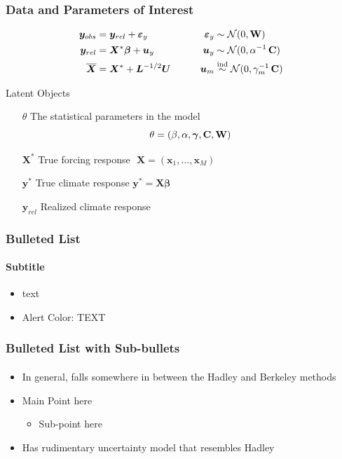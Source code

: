 \documentclass{beamer}
\newcommand{\C}{\ensuremath{\text{Cov}}}
\def\*#1{\bm{#1}}
\def\C{\textbf{\text{C}}}
\def\W{\textbf{\text{W}}}
\begin{document}
\begin{frame}
\frametitle{Data and Parameters of Interest}

\begin{block}{}
\vspace*{-\baselineskip}\setlength\belowdisplayshortskip{0pt}
\begin{alignat*}{3}
\*y_{obs} &= \*y_{rel} + \*\varepsilon_y  \qquad \quad &\*\varepsilon_y &\sim \mathcal N(0,\W)\\
\*y_{rel} &= \*X^* \*\beta + \*u_y \nonumber  \qquad  &\*u_y &\sim \mathcal N(0,\alpha^{-1}\,\C) \\
\overline{\*X} &= \*X^* + \*L^{-1/2} \*U \qquad    &\*u_m &\stackrel{\text{ind}}{\sim} \mathcal N(0,\gamma_m^{-1} \, \C)  \:
\end{alignat*}
\end{block}


\alert{Latent Objects}

\begin{itemize}
\item[$\theta$] The statistical parameters in the model
\[
\theta = (\beta, \alpha, \*\gamma, \C, \W)
\]
\item[$\*X^*$] True forcing response $\,\,\*X = (\*x_1, \dots, \*x_M)$
\item[$\*y^*$] True climate response $\*y^* = \*X \* \beta$
\item[$\*y_{rel}$] Realized climate response
\end{itemize}

\end{frame}















\begin{frame}
\frametitle{Bulleted List}
  \framesubtitle{Subtitle}
  \begin{itemize}
  \item {} text
  \item \alert{Alert Color:} TEXT
  \end{itemize}  
\end{frame}


\begin{frame}
  \frametitle{Bulleted List with Sub-bullets}
  \framesubtitle{}
  \begin{itemize}
  \item In general, falls somewhere in between the Hadley and Berkeley methods 
  \item Main Point here
  \begin{itemize}
  \item Sub-point here
  \end{itemize}
  \item Has rudimentary uncertainty model that resembles Hadley
  \end{itemize}
\end{frame}
\end{document}
